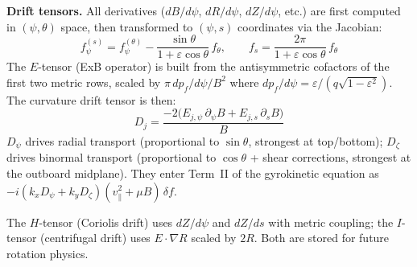 \documentclass{article}
\theoremstyle{plain}
\theoremstyle{definition}
\theoremstyle{remark}
\begin{document}
\textbf{Drift tensors.}
All derivatives ($dB/d\psi$, $dR/d\psi$, $dZ/d\psi$, etc.) are first computed in $(\psi, \theta)$ space, then transformed to $(\psi, s)$ coordinates via the Jacobian:
\begin{equation}
f^{(s)}_\psi = f^{(\theta)}_\psi - \frac{\sin\theta}{1+\varepsilon\cos\theta}\, f_\theta, \qquad
f_s = \frac{2\pi}{1+\varepsilon\cos\theta}\, f_\theta
\end{equation}
The $E$-tensor (ExB operator) is built from the antisymmetric cofactors of the first two metric rows, scaled by $\pi\, dp_f/d\psi / B^2$ where $dp_f/d\psi = \varepsilon/(q\sqrt{1-\varepsilon^2})$. The curvature drift tensor is then:
\begin{equation}
D_j = \frac{-2\bigl(E_{j,\psi}\,\partial_\psi B + E_{j,s}\,\partial_s B\bigr)}{B}
\end{equation}
$D_\psi$ drives radial transport (proportional to $\sin\theta$, strongest at top/bottom); $D_\zeta$ drives binormal transport (proportional to $\cos\theta$ + shear corrections, strongest at the outboard midplane). They enter Term~II of the gyrokinetic equation as $-i(k_x D_\psi + k_y D_\zeta)(v_\parallel^2 + \mu B)\,\delta f$.

The $H$-tensor (Coriolis drift) uses $dZ/d\psi$ and $dZ/ds$ with metric coupling; the $I$-tensor (centrifugal drift) uses $E \cdot \nabla R$ scaled by $2R$. Both are stored for future rotation physics.
\end{document}
